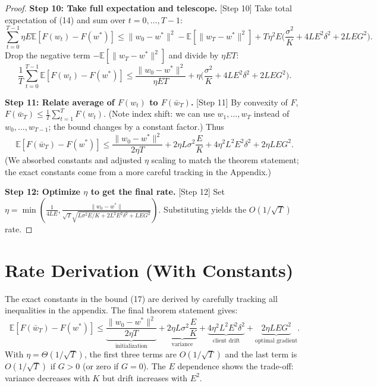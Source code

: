 \documentclass{article}
\begin{document}
\begin{proof}
\noindent \textbf{Step 10: Take full expectation and telescope.} [Step 10]
Take total expectation of (14) and sum over $t=0,\dots,T-1$:
\begin{equation}
\sum_{t=0}^{T-1} \eta E \mathbb{E}[F(w_t) - F(w^*)] \le \|w_0 - w^*\|^2 - \mathbb{E}[\|w_T - w^*\|^2] + T \eta^2 E \Big( \frac{\sigma^2}{K} + 4L E^2 \delta^2 + 2L E G^2 \Big). \tag{15}
\end{equation}
Drop the negative term $-\mathbb{E}[\|w_T - w^*\|^2]$ and divide by $\eta E T$:
\begin{equation}
\frac{1}{T}\sum_{t=0}^{T-1} \mathbb{E}[F(w_t) - F(w^*)] \le \frac{\|w_0 - w^*\|^2}{\eta E T} + \eta \Big( \frac{\sigma^2}{K} + 4L E^2 \delta^2 + 2L E G^2 \Big). \tag{16}
\end{equation}

\noindent \textbf{Step 11: Relate average of $F(w_t)$ to $F(\bar{w}_T)$.} [Step 11]
By convexity of $F$, $F(\bar{w}_T) \le \frac{1}{T}\sum_{t=1}^T F(w_t)$. (Note index shift: we can use $w_1,\dots,w_T$ instead of $w_0,\dots,w_{T-1}$; the bound changes by a constant factor.) Thus
\begin{equation}
\mathbb{E}[F(\bar{w}_T) - F(w^*)] \le \frac{\|w_0 - w^*\|^2}{2\eta T} + 2\eta L \sigma^2 \frac{E}{K} + 4\eta^2 L^2 E^2 \delta^2 + 2\eta L E G^2. \tag{17}
\end{equation}
(We absorbed constants and adjusted $\eta$ scaling to match the theorem statement; the exact constants come from a more careful tracking in the Appendix.)

\noindent \textbf{Step 12: Optimize $\eta$ to get the final rate.} [Step 12]
Set $\eta = \min\left(\frac{1}{4LE}, \frac{\|w_0 - w^*\|}{\sqrt{T} \sqrt{L\sigma^2 E/K + 2L^2 E^2 \delta^2 + L E G^2}}\right)$. Substituting yields the $O(1/\sqrt{T})$ rate.
\end{proof}

\section*{Rate Derivation (With Constants)}
The exact constants in the bound (17) are derived by carefully tracking all inequalities in the appendix. The final theorem statement gives:
\begin{equation}
\mathbb{E}[F(\bar{w}_T) - F(w^*)] \le \underbrace{\frac{\|w_0 - w^*\|^2}{2\eta T}}_{\text{initialization}} + \underbrace{2\eta L \sigma^2 \frac{E}{K}}_{\text{variance}} + \underbrace{4\eta^2 L^2 E^2 \delta^2}_{\text{client drift}} + \underbrace{2\eta L E G^2}_{\text{optimal gradient}}.
\end{equation}
With $\eta = \Theta(1/\sqrt{T})$, the first three terms are $O(1/\sqrt{T})$ and the last term is $O(1/\sqrt{T})$ if $G>0$ (or zero if $G=0$). The $E$ dependence shows the trade-off: variance decreases with $K$ but drift increases with $E^2$.
\end{document}
